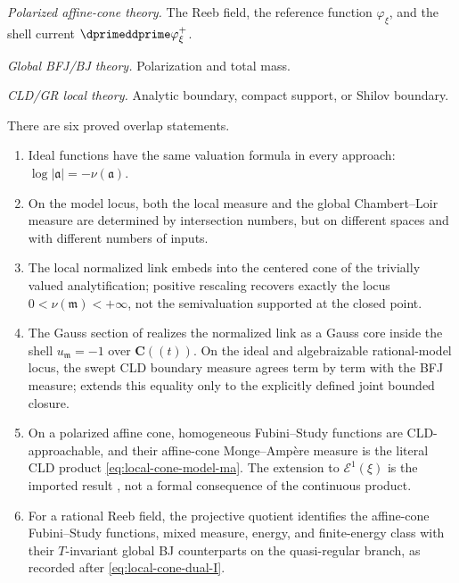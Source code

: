 \begin{description}[style=nextline,leftmargin=1.5em,labelindent=0pt,
                    itemsep=.75\baselineskip]
\emph{Polarized affine-cone theory.} The Reeb field, the reference function
$\varphi_\xi$, and the shell current
$\dprimeddprime\varphi_\xi^+$.

\emph{Global BFJ/BJ theory.} Polarization and total mass.

\emph{CLD/GR local theory.} Analytic boundary, compact support, or Shilov
boundary.
\end{description}

There are six proved overlap statements.

\begin{enumerate}
\item Ideal functions have the same valuation formula in every approach:
      $\log|\mathfrak a|=-\nu(\mathfrak a)$.
\item On the model locus, both the local measure and the global
      Chambert--Loir measure are determined by intersection numbers, but on
      different spaces and with different numbers of inputs.
\item The local normalized link embeds into the centered cone of the
      trivially valued analytification; positive rescaling recovers exactly
      the locus $0<\nu(\mathfrak m)<+\infty$, not the semivaluation
      supported at the closed point.
\item The Gauss section of  realizes the
      normalized link as a Gauss core inside the shell $u_{\mathfrak m}=-1$ over
      $\mathbf C((t))$. On the ideal and algebraizable rational-model
      locus, the swept CLD boundary measure agrees term by term with the BFJ
      measure;  extends this equality
      only to the explicitly defined joint bounded closure.
\item On a polarized affine cone, homogeneous Fubini--Study functions are
      CLD-approachable, and their affine-cone Monge--Amp\`ere measure is the
      literal CLD product \eqref{eq:local-cone-model-ma}.  The extension to
      $\mathcal E^1(\xi)$ is the imported result
      , not a formal consequence of
      the continuous product.
\item For a rational Reeb field, the projective quotient identifies the
      affine-cone Fubini--Study functions, mixed measure, energy, and
      finite-energy class with their $T$-invariant global BJ counterparts on the
      quasi-regular branch, as recorded after
      \eqref{eq:local-cone-dual-I}.
\end{enumerate}

